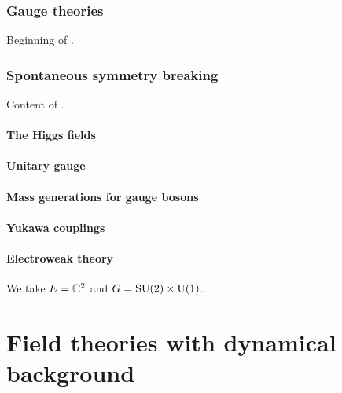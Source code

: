 \documentclass[a4paper,10pt]{article}
\begin{document}
\section{Gauge theories}

    Beginning of \cite{https://doi.org/10.48550/arxiv.1512.02632}. 



\section{Spontaneous symmetry breaking}

    Content of \cite{https://doi.org/10.48550/arxiv.1512.02632}.

    \subsection{The Higgs fields}

    \subsection{Unitary gauge}

    \subsection{Mass generations for gauge bosons}

    \subsection{Yukawa couplings}

    \subsection{Electroweak theory}

        We take $E=\mathbb{C}^2$ and $G=\text{SU}(2)\times\text{U}(1)$.

\part{Field theories with dynamical background}

\pagebreak

\nocite{*}



\printbibliography
\end{document}
